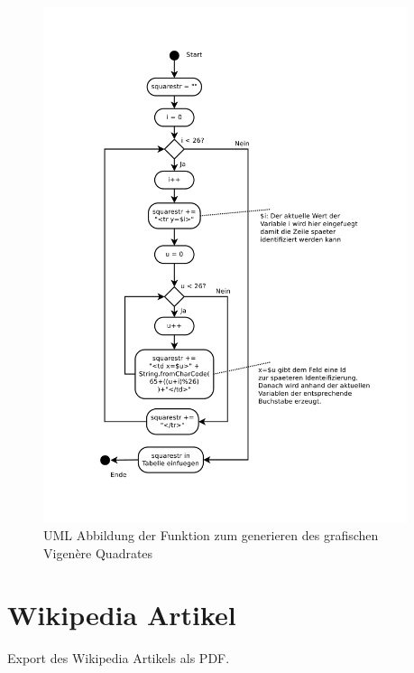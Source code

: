\documentclass[11pt,paper=a4,final]{scrartcl}
\begin{document}
\newpage
\begin{figure}[h!]
  \centering
  \includegraphics[width=0.95\textwidth]{gensquare.pdf}
  \caption{UML Abbildung der Funktion zum generieren des grafischen Vigen\`ere
  Quadrates}
  \label{fig:gensquare}
\end{figure}

\newpage
\section{Wikipedia Artikel}
Export des Wikipedia Artikels als PDF.

\end{document}
